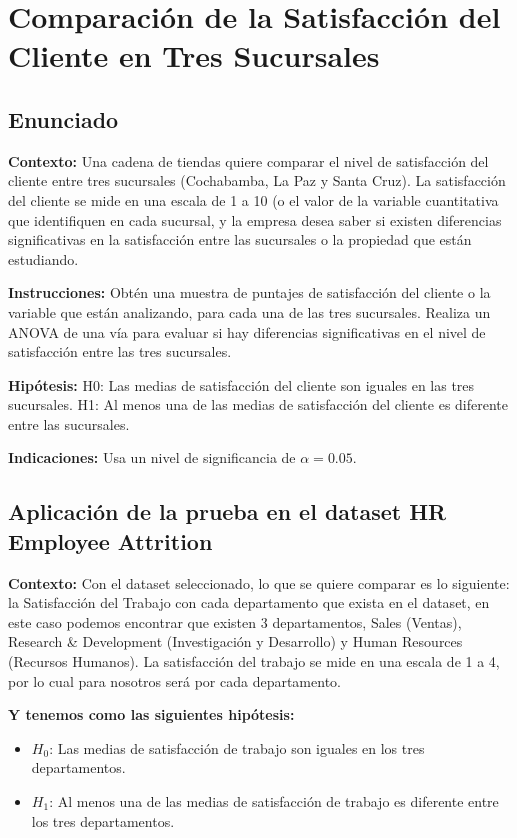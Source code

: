 \newpage
\section{Comparación de la Satisfacción del Cliente en Tres Sucursales}
\subsection{Enunciado}
\textbf{Contexto:}
Una cadena de tiendas quiere comparar el nivel de satisfacción del cliente entre tres sucursales (Cochabamba, La Paz y Santa Cruz).
La satisfacción del cliente se mide en una escala de 1 a 10 (o el valor de la variable cuantitativa que identifiquen en cada sucursal,
y la empresa desea saber si existen diferencias significativas en la satisfacción entre las sucursales o la propiedad que están estudiando.

\textbf{Instrucciones:}
Obtén una muestra de puntajes de satisfacción del cliente o la variable que están analizando, para cada una de las tres sucursales.
Realiza un ANOVA de una vía para evaluar si hay diferencias significativas en el nivel de satisfacción entre las tres sucursales.

\textbf{Hipótesis:}
H0: Las medias de satisfacción del cliente son iguales en las tres sucursales.
H1: Al menos una de las medias de satisfacción del cliente es diferente entre las sucursales.

\textbf{Indicaciones:}
Usa un nivel de significancia de \(\alpha=0.05.\)

\subsection{Aplicación de la prueba en el dataset HR Employee Attrition}

\textbf{Contexto:}
Con el dataset seleccionado, lo que se quiere comparar es lo siguiente: la Satisfacción del Trabajo con 
cada departamento que exista en el dataset, en este caso podemos encontrar que existen 3 departamentos, 
Sales (Ventas), Research \& Development (Investigación y Desarrollo) y Human Resources (Recursos Humanos).
La satisfacción del trabajo se mide en una escala de 1 a 4, por lo cual para nosotros será por cada departamento.

\textbf{Y tenemos como las siguientes hipótesis:}

\begin{itemize}
    \item $H_0$: Las medias de satisfacción de trabajo son iguales en los tres departamentos.
    \item $H_1$: Al menos una de las medias de satisfacción de trabajo es diferente entre los tres departamentos.
\end{itemize}

